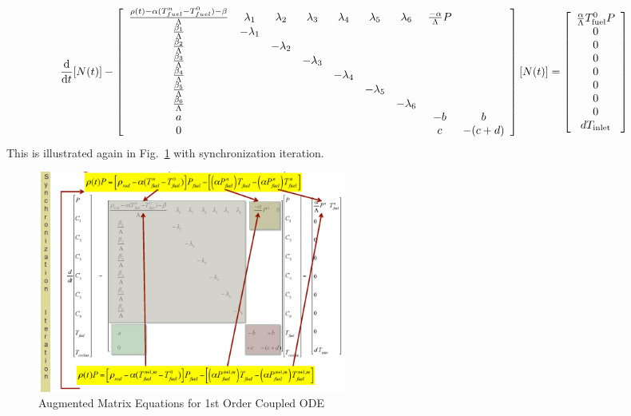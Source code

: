 \documentclass{school-22.211-notes}
\begin{document}
\begin{align}
\frac{\mathrm{d}}{\mathrm{d}t} [N(t)] - \left[ \begin{array}{ccccccccc}
\frac{\rho(t) - \alpha(T_{fuel}^n - T_{fuel}^0) -  \beta}{\Lambda} & \lambda_1  & \lambda_2 & \lambda_3 & \lambda_4 & \lambda_5 & \lambda_6 & \frac{-\alpha}{\Lambda} P & \\ 
\frac{\beta_1}{\Lambda}         & - \lambda_1 &          &           &           &           &           & &\\
\frac{\beta_2}{\Lambda}         &             & -\lambda_2 &         &           &           &           & &\\
\frac{\beta_3}{\Lambda}         &             &            & -\lambda_3 &        &           &           & &\\
\frac{\beta_4}{\Lambda}         &             &           &          & - \lambda_4 &         &           & &\\
\frac{\beta_5}{\Lambda}         &             &           &          &           & -\lambda_5 &          & &\\
\frac{\beta_6}{\Lambda}         &             &           &          &           &           & - \lambda_6&& \\
a                               &             &           &          &           &           & & -b & b \\
0                               &             &           &          &           &           & & c & -(c+d) \\
\end{array} \right] [N(t)] 
&= 
\left[ \begin{array}{c} \frac{\alpha}{\Lambda} T_{\mathrm{fuel}}^0 P \\ 0 \\ 0 \\ 0 \\ 0 \\ 0\\ 0 \\ 0 \\ d T_{\mathrm{inlet}} \end{array} \right]  
\end{align}
This is illustrated again in Fig.~\ref{augmented-matrix} with synchronization iteration. 
\begin{figure}[h]
  \centering
  \includegraphics[width=4in]{images/pke/augmented-matrix.png}
  \caption{Augmented Matrix Equations for 1st Order Coupled ODE} \label{augmented-matrix}
\end{figure}
\end{document}
